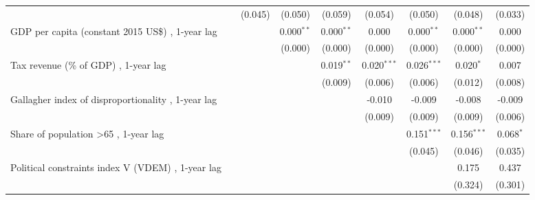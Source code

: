 \begin{table}[htbp]
\begin{tabular}{lcccccccc}
                                                                                        &               & (0.045)      & (0.050)      & (0.059)      & (0.054)       & (0.050)       & (0.048)       & (0.033)\\   
      GDP per capita (constant 2015 US\$) , 1-year lag                                  &               &              & 0.000$^{**}$ & 0.000$^{**}$ & 0.000         & 0.000$^{**}$  & 0.000$^{**}$  & 0.000\\   
                                                                                        &               &              & (0.000)      & (0.000)      & (0.000)       & (0.000)       & (0.000)       & (0.000)\\   
      Tax revenue (\% of GDP) , 1-year lag                                              &               &              &              & 0.019$^{**}$ & 0.020$^{***}$ & 0.026$^{***}$ & 0.020$^{*}$   & 0.007\\   
                                                                                        &               &              &              & (0.009)      & (0.006)       & (0.006)       & (0.012)       & (0.008)\\   
      Gallagher index of disproportionality , 1-year lag                                &               &              &              &              & -0.010        & -0.009        & -0.008        & -0.009\\   
                                                                                        &               &              &              &              & (0.009)       & (0.009)       & (0.009)       & (0.006)\\   
      Share of population >65 , 1-year lag                                              &               &              &              &              &               & 0.151$^{***}$ & 0.156$^{***}$ & 0.068$^{*}$\\   
                                                                                        &               &              &              &              &               & (0.045)       & (0.046)       & (0.035)\\   
      Political constraints index V (VDEM) , 1-year lag                                 &               &              &              &              &               &               & 0.175         & 0.437\\   
                                                                                        &               &              &              &              &               &               & (0.324)       & (0.301)\\   

\end{tabular}
\end{table}
